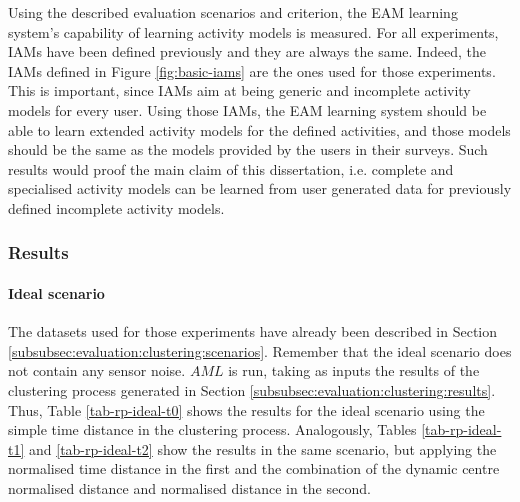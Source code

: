 Using the described evaluation scenarios and criterion, the EAM learning system's capability of learning activity models is measured. For all experiments, IAMs have been defined previously and they are always the same. Indeed, the IAMs defined in Figure \ref{fig:basic-iams} are the ones used for those experiments. This is important, since IAMs aim at being generic and incomplete activity models for every user. Using those IAMs, the EAM learning system should be able to learn extended activity models for the defined activities, and those models should be the same as the models provided by the users in their surveys. Such results would proof the main claim of this dissertation, i.e. complete and specialised activity models can be learned from user generated data for previously defined incomplete activity models.

\subsubsection{Results}
\label{subsubsec:evaluation:eam:results}

\paragraph*{Ideal scenario}

The datasets used for those experiments have already been described in Section \ref{subsubsec:evaluation:clustering:scenarios}. Remember that the ideal scenario does not contain any sensor noise. $AML$ is run, taking as inputs the results of the clustering process generated in Section \ref{subsubsec:evaluation:clustering:results}. Thus, Table \ref{tab-rp-ideal-t0} shows the results for the ideal scenario using the simple time distance in the clustering process. Analogously, Tables \ref{tab-rp-ideal-t1} and \ref{tab-rp-ideal-t2} show the results in the same scenario, but applying the normalised time distance in the first and the combination of the dynamic centre normalised distance and normalised distance in the second. 


